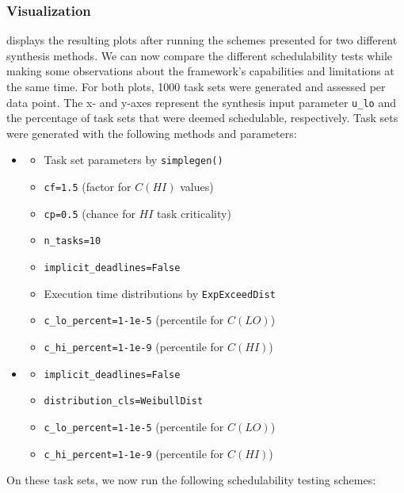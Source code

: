 \documentclass[a4paper,oneside]{csthesis}
\begin{document}
\subsubsection{Visualization}
 displays the resulting plots after running the schemes presented for two different synthesis methods. We can now compare the different schedulability tests while making some observations about the framework's capabilities and limitations at the same time. For both plots, 1000 task sets were generated and assessed per data point. The x- and y-axes represent the synthesis input parameter \texttt{u\_lo} and the percentage of task sets that were deemed schedulable, respectively. Task sets were generated with the following methods and parameters:
\begin{itemize}
    \item \textbf{}
    \begin{itemize}
        \item Task set parameters by \texttt{simplegen()}
        \item \texttt{cf=1.5} (factor for $C(HI)$ values)
        \item \texttt{cp=0.5} (chance for $HI$ task criticality)
        \item \texttt{n\_tasks=10}
        \item \texttt{implicit\_deadlines=False}
        \item Execution time distributions by \texttt{ExpExceedDist}
        \item \texttt{c\_lo\_percent=1-1e-5} (percentile for $C(LO)$)
        \item \texttt{c\_hi\_percent=1-1e-9} (percentile for $C(HI)$)
    \end{itemize}
    \item \textbf{}
    \begin{itemize}
        \item \texttt{implicit\_deadlines=False}
        \item \texttt{distribution\_cls=WeibullDist}
        \item \texttt{c\_lo\_percent=1-1e-5} (percentile for $C(LO)$)
        \item \texttt{c\_hi\_percent=1-1e-9} (percentile for $C(HI)$)
    \end{itemize}
\end{itemize}
On these task sets, we now run the following schedulability testing schemes:
\end{document}
